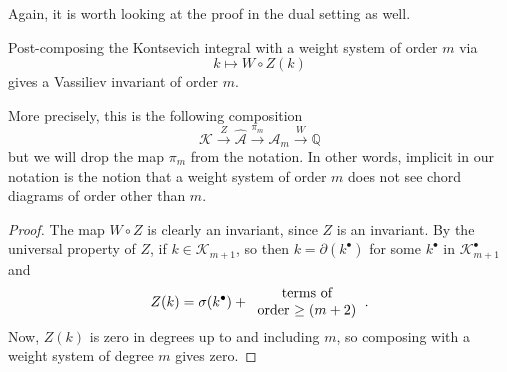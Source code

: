 Again, it is worth looking at the proof in the dual setting as well.

\begin{lemma}
	\label{lem:kontsevich-integral-then-weight-system-is-vassiliev}
	Post-composing the Kontsevich integral with a weight system of order \(m\) via
	\[k \longmapsto W \circ Z(k)\]
	gives a Vassiliev invariant of order \(m\).
\end{lemma}

\begin{warning}
	More precisely, this is the following composition
	\[\mathcal{K} \overset{Z}{\longrightarrow} \widehat{\mathcal{A}} \overset{\pi_{m}}{\longrightarrow} \mathcal{A}_{m} \overset{W}{\longrightarrow} \mathbb{Q}\]
	but we will drop the map \(\pi_{m}\) from the notation. In other words, implicit in our notation is the notion that a weight system of order \(m\) does not see chord diagrams of order other than \(m\).
\end{warning}

\begin{proof}
	The map \(W \circ Z\) is clearly an invariant, since \(Z\) is an invariant. By the universal property of \(Z\), if \(k \in \mathcal{K}_{m + 1}\), so then \(k = \partial (k^{\bullet})\) for some \(k^{\bullet}\) in \(\mathcal{K}^{\bullet}_{m + 1}\) and
	\[Z(k) = \sigma(k^{\bullet}) + \parbox{2.9cm}{\centering terms of \\ order \(\geq(m + 2)\)}.\]
	Now, \(Z(k)\) is zero in degrees up to and including \(m\), so composing with a weight system of degree \(m\) gives zero.
\end{proof}

